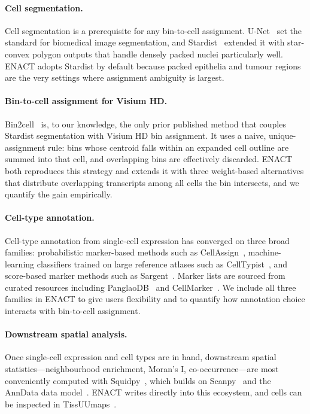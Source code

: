 \paragraph{Cell segmentation.}
Cell segmentation is a prerequisite for any bin-to-cell assignment. U-Net~\cite{ronneberger2015unet} set the standard for biomedical image segmentation, and Stardist~\cite{schmidt2018stardist} extended it with star-convex polygon outputs that handle densely packed nuclei particularly well. ENACT adopts Stardist by default because packed epithelia and tumour regions are the very settings where assignment ambiguity is largest.

\paragraph{Bin-to-cell assignment for Visium HD.}
Bin2cell~\cite{polacco2024bin2cell} is, to our knowledge, the only prior published method that couples Stardist segmentation with Visium HD bin assignment. It uses a naive, unique-assignment rule: bins whose centroid falls within an expanded cell outline are summed into that cell, and overlapping bins are effectively discarded. ENACT both reproduces this strategy and extends it with three weight-based alternatives that distribute overlapping transcripts among all cells the bin intersects, and we quantify the gain empirically.

\paragraph{Cell-type annotation.}
Cell-type annotation from single-cell expression has converged on three broad families: probabilistic marker-based methods such as CellAssign~\cite{zhang2019probabilistic}, machine-learning classifiers trained on large reference atlases such as CellTypist~\cite{conde2022celltypist}, and score-based marker methods such as Sargent~\cite{nouri2024sargent}. Marker lists are sourced from curated resources including PanglaoDB~\cite{franzen2019panglaodb} and CellMarker~\cite{zhang2019cellmarker}. We include all three families in ENACT to give users flexibility and to quantify how annotation choice interacts with bin-to-cell assignment.

\paragraph{Downstream spatial analysis.}
Once single-cell expression and cell types are in hand, downstream spatial statistics---neighbourhood enrichment, Moran's I, co-occurrence---are most conveniently computed with Squidpy~\cite{palla2022squidpy}, which builds on Scanpy~\cite{wolf2018scanpy} and the AnnData data model~\cite{virshup2024anndata}. ENACT writes directly into this ecosystem, and cells can be inspected in TissUUmaps~\cite{pielawski2023tissuumaps}.
